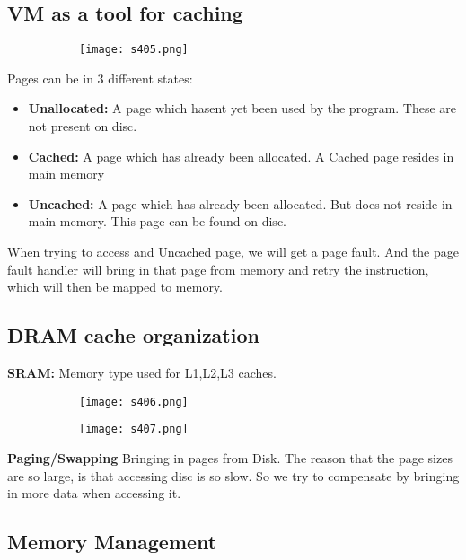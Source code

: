 \documentclass[8pt]{extreport}
\begin{document}
\subsection{VM as a tool for caching}
\begin{figure}[H]
\begin{subfigure}[b]{0.4\linewidth}
\texttt{[image: s405.png]}
\end{subfigure}
\end{figure}
Pages can be in 3 different states:
\begin{itemize}
\item \textbf{Unallocated:} A page which hasent yet been used by the program. These are not present on disc.
\item \textbf{Cached:} A page which has already been allocated. A Cached page resides in main memory
\item \textbf{Uncached:} A page which has already been allocated. But does not reside in main memory. This page can be found on disc.
\end{itemize}
When trying to access and Uncached page, we will get a page fault. And the page fault handler will bring in that page from memory and retry the instruction, which will then be mapped to memory.


\subsection{DRAM cache organization}

\textbf{SRAM:} Memory type used for L1,L2,L3 caches.
\begin{figure}[H]
\begin{subfigure}[b]{0.4\linewidth}
\texttt{[image: s406.png]}
\end{subfigure}
\begin{subfigure}[b]{0.4\linewidth}
\texttt{[image: s407.png]}
\end{subfigure}
\end{figure}

\textbf{Paging/Swapping} Bringing in pages from Disk. The reason that the page sizes are so large, is that accessing disc is so slow. So we try to compensate by bringing in more data when accessing it.

\subsection{Memory Management}
\end{document}
